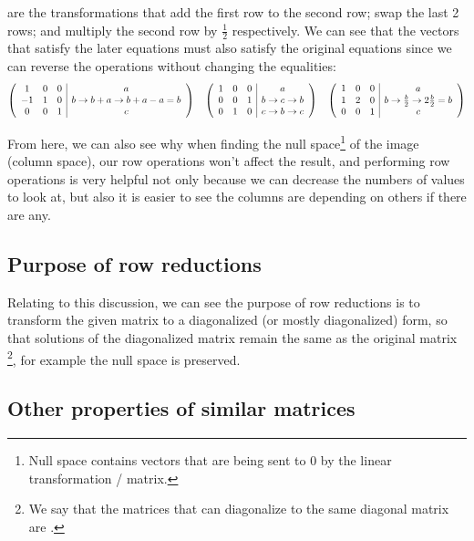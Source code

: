 \documentclass[11pt, cyan, night, 1in]{LatexTemplate/hw}
\begin{document}
are the transformations that add the first row to the second row; swap the last 2 rows; and multiply the second row by $\frac12$ respectively. We can see that the vectors that satisfy the later equations must also satisfy the original equations since we can reverse the operations without changing the equalities:\[
    \left(\begin{array}{ccc|c}
        1 & 0 & 0  & a\\
        -1 & 1 & 0  & b \rightarrow b + a \rightarrow b + a - a = b\\
        0 & 0 & 1 & c
    \end{array}\right) \quad \left(\begin{array}{ccc|c}
        1 & 0 & 0  & a\\
        0 & 0 & 1  & b \rightarrow c \rightarrow b\\
        0 & 1 & 0 & c \rightarrow b \rightarrow c
    \end{array}\right) \quad \left(\begin{array}{ccc|c}
        1 & 0 & 0  & a\\
        1 & 2 & 0  & b \rightarrow \frac{b}{2} \rightarrow 2\frac{b}{2} = b\\
        0 & 0 & 1 & c
    \end{array}\right) 
    \]

From here, we can also see why when finding the null space\footnote{Null space contains vectors that are being sent to 0 by the linear transformation / matrix.} of the image (column space), our row operations won't affect the result, and performing row operations is very helpful not only because we can decrease the numbers of values to look at, but also it is easier to see  the columns are depending on others if there are any.

\subsection{Purpose of row reductions}

Relating to this discussion, we can see the purpose of row reductions is to transform the given matrix to a diagonalized (or mostly diagonalized) form, so that  solutions of the diagonalized matrix remain the same as the original matrix \footnote{We say that the matrices that can diagonalize to the same diagonal matrix are .}, for example the null space is preserved. 

\subsection{Other properties of similar matrices}
\end{document}
